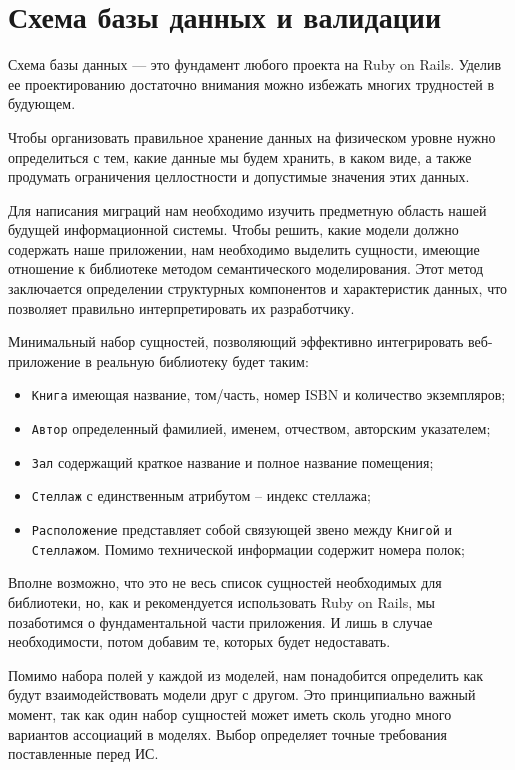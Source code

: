 \section{Схема базы данных и валидации}
Схема базы данных --- это фундамент любого проекта на Ruby on Rails. Уделив ее
проектированию достаточно внимания можно избежать многих трудностей в будующем.

Чтобы организовать правильное хранение данных на физическом уровне
нужно определиться с тем, какие данные мы будем хранить,
в каком виде, а также
продумать ограничения целлостности и допустимые значения этих данных.

Для написания миграций нам необходимо изучить предметную область нашей будущей информационной системы.
Чтобы решить, какие модели должно содержать наше приложении, нам необходимо выделить сущности,
имеющие отношение к библиотеке методом семантического моделирования.
Этот метод заключается определении структурных компонентов и характеристик данных, что позволяет
правильно интерпретировать их разработчику.

Минимальный набор сущностей, позволяющий эффективно интегрировать веб-приложение
в реальную библиотеку будет таким:
\begin{itemize}
\item \verb|Книга| имеющая название, том/часть, номер ISBN и количество экземпляров;
\item \verb|Автор| определенный фамилией, именем, отчеством, авторским указателем;
\item \verb|Зал| содержащий краткое название и полное название помещения;
\item \verb|Стеллаж| с единственным атрибутом -- индекс стеллажа;
\item \verb|Расположение| представляет собой связующей звено между \verb|Книгой|
и \verb|Стеллажом|. Помимо технической информации содержит номера полок;
\end{itemize}

Вполне возможно, что это не весь список сущностей необходимых для библиотеки,
но, как и рекомендуется использовать Ruby on Rails, мы позаботимся о фундаментальной
части приложения. И лишь в случае необходимости, потом добавим те, которых будет
недоставать.

Помимо набора полей у каждой из моделей, нам понадобится определить
как будут взаимодействовать
модели друг с другом. Это принципиально важный момент, так как
один набор сущностей может иметь сколь угодно
много вариантов ассоциаций в моделях. Выбор определяет
точные требования поставленные перед ИС.

